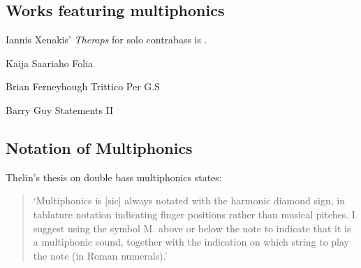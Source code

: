 \subsection{Works featuring multiphonics}
Iannis Xenakis' \emph{Theraps} for solo contrabass is \lipsum[1].\autocite[]{}

Kaija Saariaho Folia

Brian Ferneyhough Trittico Per G.S

Barry Guy Statements II

\subsection{Notation of Multiphonics}

Thelin's thesis on double bass multiphonics states:
\begin{quotation}
    `Multiphonics is [sic] always notated with the harmonic diamond sign, in tablature notation
indicating finger positions rather than musical pitches. I suggest using the symbol M. above or
below the note to indicate that it is a multiphonic sound, together with the indication on which
string to play the note (in Roman numerals).'\autocite[6]{thelinMultiphonicsDoubleBass2011}
\end{quotation}

